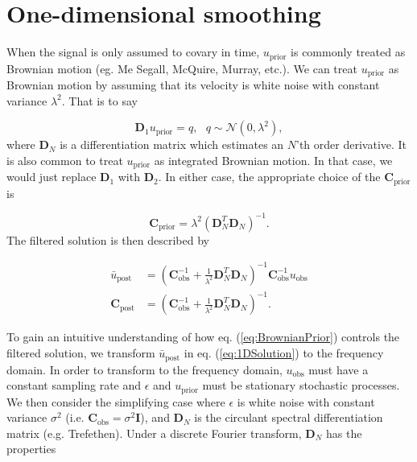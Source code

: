 \documentclass[10pt,a4paper]{article}
\begin{document}
\section*{One-dimensional smoothing}
When the signal is only assumed to covary in time, $u_\mathrm{prior}$ is commonly treated as Brownian motion (eg. Me Segall, McQuire, Murray, etc.).  We can treat $u_\mathrm{prior}$ as Brownian motion by assuming that its velocity is white noise with constant variance $\lambda^2$. That is to say

\begin{equation}
  \mathbf{D}_1 u_\mathrm{prior} = q, \ \ \ q \sim \mathcal{N}(0,\lambda^2),
\end{equation}     
where $\mathbf{D}_N$ is a differentiation matrix which estimates an $N$'th order derivative. It is also common to treat $u_\mathrm{prior}$ as integrated Brownian motion. In that case, we would just replace $\mathbf{D}_1$ with $\mathbf{D}_2$. In either case, the appropriate choice of the $\mathbf{C}_\mathrm{prior}$ is   

\begin{equation}\label{eq:BrownianPrior}
\mathbf{C_\mathrm{prior}} = \lambda^2(\mathbf{D}_N^T\mathbf{D}_N)^{-1}.
\end{equation}
The filtered solution is then described by

\begin{equation}\label{eq:1DSolution}
\begin{split}
\bar{u}_\mathrm{post} &= (\mathbf{C}_\mathrm{obs}^{-1} +   
                   \frac{1}{\lambda^2}\mathbf{D}_N^T\mathbf{D}_N)^{-1}\mathbf{C}_\mathrm{obs}^{-1}
                   u_\mathrm{obs}
\\
\mathbf{C}_\mathrm{post} &= (\mathbf{C}_\mathrm{obs}^{-1} +   
                            \frac{1}{\lambda^2}\mathbf{D}_N^T\mathbf{D}_N)^{-1}.
\end{split}
\end{equation}

To gain an intuitive understanding of how eq. (\ref{eq:BrownianPrior}) controls the filtered solution, we transform $\bar{u}_\mathrm{post}$ in eq. (\ref{eq:1DSolution}) to the frequency domain.  In order to transform to the frequency domain, $u_\mathrm{obs}$ must have a constant sampling rate and $\epsilon$ and $u_\mathrm{prior}$ must be stationary stochastic processes.  We then consider the simplifying case where $\epsilon$ is white noise with constant variance $\sigma^2$ (i.e. $\mathbf{C}_\mathrm{obs} = \sigma^2\mathbf{I}$), and $\mathbf{D}_N$ is the circulant spectral differentiation matrix (e.g. Trefethen).  Under a discrete Fourier transform, $\mathbf{D}_N$ has the properties
\end{document}
